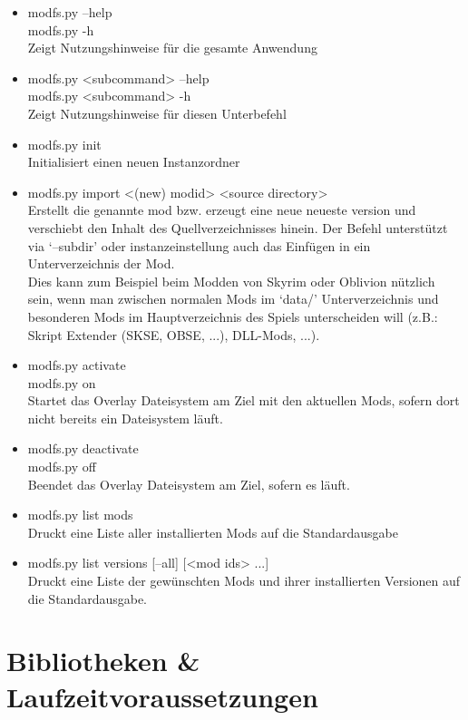 \documentclass[a4paper,numbers=withenddot,11pt]{scrartcl}
\begin{document}
\begin{itemize}
  \item modfs.py --help\\
        modfs.py -h\\
        Zeigt Nutzungshinweise für die gesamte Anwendung
  \item modfs.py <subcommand> --help\\
        modfs.py <subcommand> -h\\
        Zeigt Nutzungshinweise für diesen Unterbefehl
  \item modfs.py init\\
        Initialisiert einen neuen Instanzordner
  \item modfs.py import \textless{}(new) modid\textgreater{} \textless{}source directory\textgreater{}\\
        Erstellt die genannte mod bzw. erzeugt eine neue neueste version und
        verschiebt den Inhalt des Quellverzeichnisses hinein.
        Der Befehl unterstützt via `--subdir' oder instanzeinstellung auch das
        Einfügen in ein Unterverzeichnis der Mod.\\
        Dies kann zum Beispiel beim Modden von Skyrim oder Oblivion nützlich sein,
        wenn man zwischen normalen Mods im `data/' Unterverzeichnis und
        besonderen Mods im Hauptverzeichnis des Spiels unterscheiden will
        (z.B.: Skript Extender (SKSE, OBSE, ...), DLL-Mods, ...).
  \item modfs.py activate\\
        modfs.py on\\
        Startet das Overlay Dateisystem am Ziel mit den aktuellen Mods,
        sofern dort nicht bereits ein Dateisystem läuft.
  \item modfs.py deactivate\\
        modfs.py off\\
        Beendet das Overlay Dateisystem am Ziel, sofern es läuft.
  \item modfs.py list mods\\
        Druckt eine Liste aller installierten Mods auf die Standardausgabe
  \item modfs.py list versions [--all] [<mod ids> ...]\\
        Druckt eine Liste der gewünschten Mods und ihrer installierten Versionen
        auf die Standardausgabe.
\end{itemize}

\section{Bibliotheken \& Laufzeitvoraussetzungen}
\end{document}
